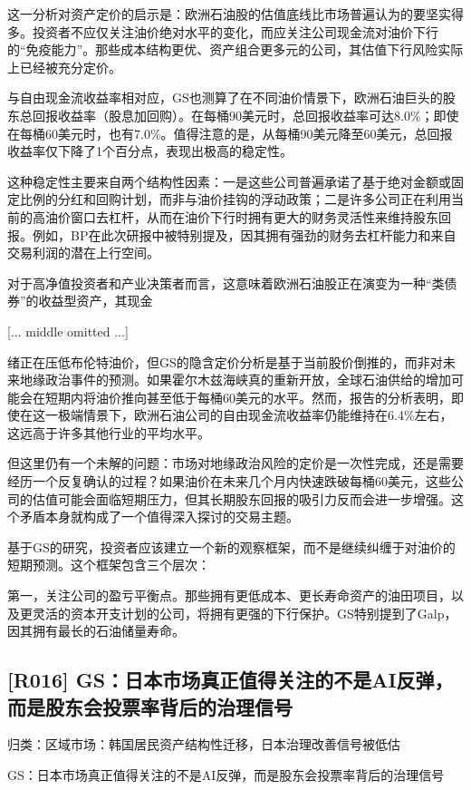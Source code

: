 \documentclass[11pt]{ctexart}
\begin{document}
这一分析对资产定价的启示是：欧洲石油股的估值底线比市场普遍认为的要坚实得多。投资者不应仅关注油价绝对水平的变化，而应关注公司现金流对油价下行的“免疫能力”。那些成本结构更优、资产组合更多元的公司，其估值下行风险实际上已经被充分定价。

与自由现金流收益率相对应，GS也测算了在不同油价情景下，欧洲石油巨头的股东总回报收益率（股息加回购）。在每桶90美元时，总回报收益率可达8.0\%；即使在每桶60美元时，也有7.0\%。值得注意的是，从每桶90美元降至60美元，总回报收益率仅下降了1个百分点，表现出极高的稳定性。

这种稳定性主要来自两个结构性因素：一是这些公司普遍承诺了基于绝对金额或固定比例的分红和回购计划，而非与油价挂钩的浮动政策；二是许多公司正在利用当前的高油价窗口去杠杆，从而在油价下行时拥有更大的财务灵活性来维持股东回报。例如，BP在此次研报中被特别提及，因其拥有强劲的财务去杠杆能力和来自交易利润的潜在上行空间。

对于高净值投资者和产业决策者而言，这意味着欧洲石油股正在演变为一种“类债券”的收益型资产，其现金

[... middle omitted ...]

绪正在压低布伦特油价，但GS的隐含定价分析是基于当前股价倒推的，而非对未来地缘政治事件的预测。如果霍尔木兹海峡真的重新开放，全球石油供给的增加可能会在短期内将油价推向甚至低于每桶60美元的水平。然而，报告的分析表明，即使在这一极端情景下，欧洲石油公司的自由现金流收益率仍能维持在6.4\%左右，这远高于许多其他行业的平均水平。

但这里仍有一个未解的问题：市场对地缘政治风险的定价是一次性完成，还是需要经历一个反复确认的过程？如果油价在未来几个月内快速跌破每桶60美元，这些公司的估值可能会面临短期压力，但其长期股东回报的吸引力反而会进一步增强。这个矛盾本身就构成了一个值得深入探讨的交易主题。

基于GS的研究，投资者应该建立一个新的观察框架，而不是继续纠缠于对油价的短期预测。这个框架包含三个层次：

第一，关注公司的盈亏平衡点。那些拥有更低成本、更长寿命资产的油田项目，以及更灵活的资本开支计划的公司，将拥有更强的下行保护。GS特别提到了Galp，因其拥有最长的石油储量寿命。

\subsection{[R016] GS：日本市场真正值得关注的不是AI反弹，而是股东会投票率背后的治理信号}
{\small\color{refgray}归类：区域市场：韩国居民资产结构性迁移，日本治理改善信号被低估}

GS：日本市场真正值得关注的不是AI反弹，而是股东会投票率背后的治理信号
\end{document}
